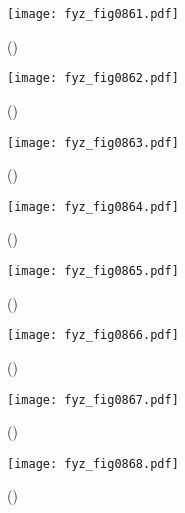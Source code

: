     \begin{figure}[ht!] %
      \centering
      \texttt{[image: fyz\_fig0861.pdf]}
      \caption{
               (\cite[s.~707]{Feynman02})}
      \label{fyz:fig0861}
    \end{figure}

    \begin{figure}[ht!] %
      \centering
      \texttt{[image: fyz\_fig0862.pdf]}
      \caption{
               (\cite[s.~707]{Feynman02})}
      \label{fyz:fig0862}
    \end{figure}

    \begin{figure}[ht!] %
      \centering
      \texttt{[image: fyz\_fig0863.pdf]}
      \caption{
               (\cite[s.~707]{Feynman02})}
      \label{fyz:fig0863}
    \end{figure}

    \begin{figure}[ht!] %
      \centering
      \texttt{[image: fyz\_fig0864.pdf]}
      \caption{
               (\cite[s.~707]{Feynman02})}
      \label{fyz:fig0864}
    \end{figure}

    \begin{figure}[ht!] %
      \centering
      \texttt{[image: fyz\_fig0865.pdf]}
      \caption{
               (\cite[s.~707]{Feynman02})}
      \label{fyz:fig0865}
    \end{figure}

    \begin{figure}[ht!] %
      \centering
      \texttt{[image: fyz\_fig0866.pdf]}
      \caption{
               (\cite[s.~707]{Feynman02})}
      \label{fyz:fig0866}
    \end{figure}

    \begin{figure}[ht!] %
      \centering
      \texttt{[image: fyz\_fig0867.pdf]}
      \caption{
               (\cite[s.~707]{Feynman02})}
      \label{fyz:fig0867}
    \end{figure}

    \begin{figure}[ht!] %
      \centering
      \texttt{[image: fyz\_fig0868.pdf]}
      \caption{
               (\cite[s.~707]{Feynman02})}
      \label{fyz:fig0868}
    \end{figure}

